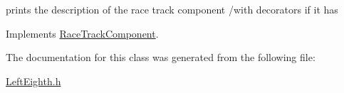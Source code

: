 prints the description of the race track component /with decorators if it has 

Implements \mbox{\hyperlink{class_race_track_component_a02a8d9520cfd80f31dd94b5fa1e76d47}{Race\+Track\+Component}}.



The documentation for this class was generated from the following file\+:\begin{DoxyCompactItemize}
\item 
\mbox{\hyperlink{_left_eighth_8h}{Left\+Eighth.\+h}}\end{DoxyCompactItemize}
